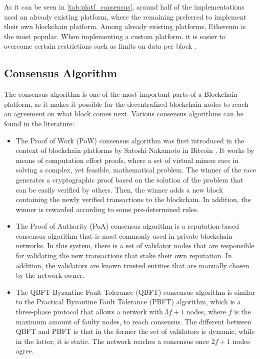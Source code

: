 As it can be seen in \autoref{tab:platf_consensus}, around half of the implementations used an already existing platform, where the remaining preferred to implement their own blockchain platform. Among already existing platforms, Ethereum is the most popular. When implementing a custom platform, it is easier to overcome certain restrictions such as limits on data per block \cite{8733825, 9524833}.

\subsection{Consensus Algorithm}\label{background:consensus_algorithms}

The consensus algorithm is one of the most important parts of a Blockchain platform, as it makes it possible for the decentralized blockchain nodes to reach an agreement on what block comes next. Various consensus algorithms can be found in the literature:

\begin{itemize}
    \item The Proof of Work (PoW) consensus algorithm was first introduced in the context of blockchain platforms by Satoshi Nakamoto in Bitcoin \cite{nakamoto2009bitcoin}. It works by means of computation effort proofs, where a set of virtual miners race in solving a complex, yet feasible, mathematical problem. The winner of the race generates a cryptographic proof based on the solution of the problem that can be easily verified by others. Then, the winner adds a new block containing the newly verified transactions to the blockchain. In addition, the winner is rewarded according to some pre-determined rules.
    
    \item The Proof of Authority (PoA) consensus algorithm is a reputation-based consensus algorithm that is most commonly used in private blockchain networks. In this system, there is a set of validator nodes that are responsible for validating the new transactions that stake their own reputation. In addition, the validators are known trusted entities that are manually chosen by the network owner.

    \item The QBFT Byzantine Fault Tolerance (QBFT) \cite{10.48550/arxiv.2002.03613} consensus algorithm is similar to the Practical Byzantine Fault Tolerance (PBFT) algorithm, which is a three-phase protocol that allows a network with $3f+1$ nodes, where $f$ is the maximum amount of faulty nodes, to reach consensus. The different between QBFT and PBFT is that in the former the set of validators is dynamic, while in the latter, it is static. The network reaches a consensus once $2f+1$ nodes agree.
\end{itemize}

